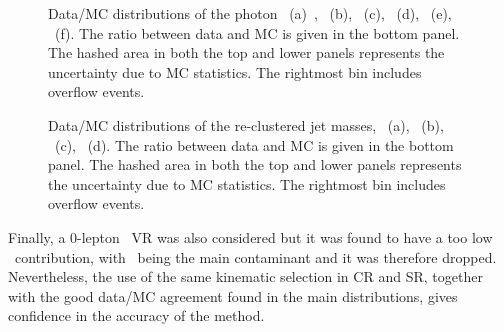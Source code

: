 		\begin{figure}[htbp]
		\centering
		\caption{Data/MC distributions of the photon \pt~(a)~\cite{stop0L}, \mttwo~(b), \mtbmin~(c), \mtbmax~(d), \HT~(e), \drbb~(f). The ratio between data and MC is given in the bottom panel. The hashed area in both the top and lower panels represents the uncertainty due to MC statistics. The rightmost bin includes overflow events.}
		\label{fig:ttV} 
		\end{figure}

		\begin{figure}[htbp]
		\centering
		\caption{Data/MC distributions of the re-clustered jet masses, \mantikttwelvezero~(a), \mantikttwelveone~(b), \mantikteightzero~(c), \mantikteightone~(d). The ratio between data and MC is given in the bottom panel. The hashed area in both the top and lower panels represents the uncertainty due to MC statistics. The rightmost bin includes overflow events.}
		\label{fig:ttVMasses} 
		\end{figure}

		Finally, a $0$-lepton \ttgamma\ \ac{VR} was also considered but it was found to have a too low \ttgamma\ contribution, with \gammajets\ being the main contaminant and it was therefore dropped. Nevertheless, the use of the same kinematic selection in \ac{CR}  and \ac{SR}, together with the good data/\ac{MC} agreement found in the main distributions, gives confidence in the accuracy of the method.



